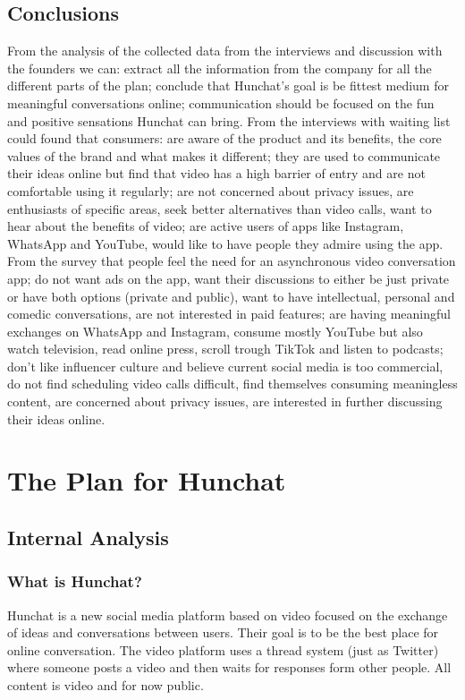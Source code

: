 \documentclass[12pt]{article}
\begin{document}
\subsection{Conclusions}\label{meth:conclusions}
From the analysis of the collected data from the interviews and discussion with the founders we can: extract all the information from the company for all the different parts of the plan; conclude that Hunchat's goal is be fittest medium for meaningful conversations online; communication should be focused on the fun and positive sensations Hunchat can bring. From the interviews with waiting list could found that consumers: are aware of the product and its benefits, the core values of the brand and what makes it different; they are used to communicate their ideas online but find that video has a high barrier of entry and are not comfortable using it regularly; are not concerned about privacy issues, are enthusiasts of specific areas, seek better alternatives than video calls, want to hear about the benefits of video; are active users of apps like Instagram, WhatsApp and YouTube, would like to have people they admire using the app. From the survey that people feel the need for an asynchronous video conversation app; do not want ads on the app, want their discussions to either be just private or have both options (private and public), want to have intellectual, personal and comedic conversations, are not interested in paid features; are having meaningful exchanges on WhatsApp and Instagram, consume mostly YouTube but also watch television, read online press, scroll trough TikTok and listen to podcasts; don't like influencer culture and believe current social media is too commercial, do not find scheduling video calls difficult, find themselves consuming meaningless content, are concerned about privacy issues, are interested in further discussing their ideas online.

\pagebreak

\section{The Plan for Hunchat}\label{plan}



\subsection{Internal Analysis}

	\subsubsection{What is Hunchat?}
Hunchat is a new social media platform based on video focused on the exchange of ideas and conversations between users. Their goal is to be the best place for online conversation. The video platform uses a thread system (just as Twitter) where someone posts a video and then waits for responses form other people. All content is video and for now public.
\end{document}
